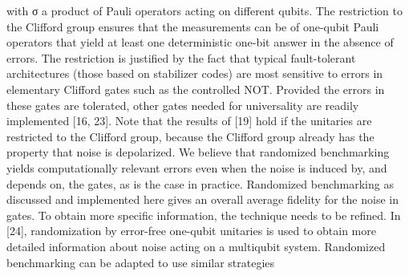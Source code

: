with σ a product of Pauli operators acting on different qubits. The restriction to the Clifford group ensures that the measurements can be of one-qubit Pauli operators that yield at least one deterministic one-bit answer in the absence of errors. The restriction is justified by the fact that typical fault-tolerant architectures (those based on stabilizer codes) are most sensitive to errors in elementary Clifford gates such as the controlled NOT. Provided the errors in these gates are tolerated, other gates needed for universality are readily implemented [16, 23]. Note that the results of [19] hold if the unitaries are restricted to the Clifford group, because the Clifford group already has the property that noise is depolarized. We believe that randomized benchmarking yields computationally relevant errors even when the noise is induced by, and depends on, the gates, as is the case in practice. Randomized benchmarking as discussed and implemented here gives an overall average fidelity for the noise in gates. To obtain more specific information, the technique needs to be refined. In [24], randomization by error-free one-qubit unitaries is used to obtain more detailed information about noise acting on a multiqubit system. Randomized benchmarking can be adapted to use similar strategies

